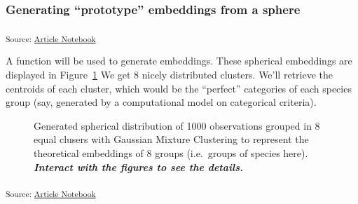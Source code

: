 \documentclass[
  authoryear]{elsarticle}
\begin{document}
\subsubsection{Generating ``prototype'' embeddings from a
sphere}\label{generating-prototype-embeddings-from-a-sphere}

\textsubscript{Source:
\href{https://m-delem.github.io/2499-similarity-manuscript/index.qmd.html}{Article
Notebook}}

A function will be used to generate embeddings. These spherical
embeddings are displayed in Figure~\ref{fig-perfect-embeddings} We get 8
nicely distributed clusters. We'll retrieve the centroids of each
cluster, which would be the ``perfect'' categories of each species group
(say, generated by a computational model on categorical criteria).

\label{cell-fig-perfect-embeddings}
\begin{figure}[H]


\caption{\label{fig-perfect-embeddings}Generated spherical distribution
of 1000 observations grouped in 8 equal clusers with Gaussian Mixture
Clustering to represent the theoretical embeddings of 8 groups
(i.e.~groups of species here). \textbf{\emph{Interact with the figures
to see the details.}}}

\end{figure}%

\textsubscript{Source:
\href{https://m-delem.github.io/2499-similarity-manuscript/index.qmd.html}{Article
Notebook}}
\end{document}
